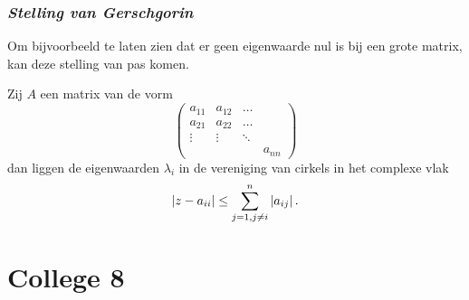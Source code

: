 \documentclass{2wn20summary}
\begin{document}
		   \subsubsection{\textit{Stelling van Gerschgorin}}
		   Om bijvoorbeeld te laten zien dat er geen eigenwaarde nul is bij een grote matrix, kan deze stelling van pas komen. 
		   \begin{theorem}
			   	Zij $A$ een matrix van de vorm
			   	\[ 
				   	\begin{pmatrix}
					   	a_{11} & a_{12} & \dots \\
					   	a_{21} & a_{22} & \dots \\
					   	\vdots & \vdots & \ddots \\
					   	 &  & & a_{nn}
				   	\end{pmatrix}
			   	 \]
			   	 dan liggen de eigenwaarden $\lambda_i$ in de vereniging van cirkels in het complexe vlak 
			   	 \[ 
				   	 {\left|z -a_{ii}\right|} \le \sum_{j=1, j\neq i}^n {\left|a_{ij}\right|} \,.
			   	  \]
		   \end{theorem}

	\newpage
	\section{College 8}
\end{document}
